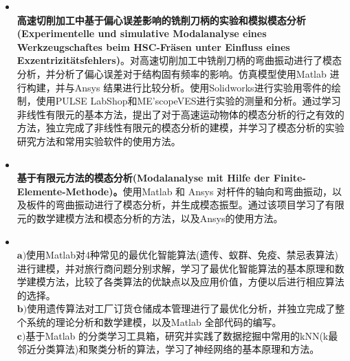 \documentclass[zh]{resume}
\begin{document}
\begin{itemize}
	\item 
	\quad {}\\
	\textbf{高速切削加工中基于偏心误差影响的铣削刀柄的实验和模拟模态分析(Experimentelle und simulative Modalanalyse eines Werkzeugs\-chaftes beim HSC-Fräsen unter Einfluss eines Exzentrizitätsfehlers)}。对高速切削加工中铣削刀柄的弯曲振动进行了模态分析，并分析了偏心误差对于结构固有频率的影响。仿真模型使用Matlab 进行构建，并与Ansys 结果进行比较分析。使用Solidworks进行实验用零件的绘制，使用PULSE LabShop和ME'scopeVES进行实验的测量和分析。通过学习非线性有限元的基本方法，提出了对于高速运动物体的模态分析的行之有效的方法，独立完成了非线性有限元的模态分析的建模，并学习了模态分析的实验研究方法和常用实验软件的使用方法。
	
	\item 
	\quad {}\\
	\textbf{基于有限元方法的模态分析(Modalanalyse mit Hilfe der Finite-Elemente-Methode)。}使用Matlab 和 Ansys 对杆件的轴向和弯曲振动，以及板件的弯曲振动进行了模态分析，并生成模态振型。通过该项目学习了有限元的数学建模方法和模态分析的方法，以及Ansys的使用方法。
	
	\item 
	\quad {}\\
	$ \mathbf{a)}  $使用Matlab对4种常见的最优化智能算法(遗传、蚁群、免疫、禁忌表算法)进行建模，并对旅行商问题分别求解，学习了最优化智能算法的基本原理和数学建模方法，比较了各类算法的优缺点以及应用价值，方便以后进行相应算法的选择。\\
	$ \mathbf{b)}  $使用遗传算法对工厂订货仓储成本管理进行了最优化分析，并独立完成了整个系统的理论分析和数学建模，以及Matlab 全部代码的编写。\\
	$ \mathbf{c)}  $基于Matlab 的分类学习工具箱，研究并实践了数据挖掘中常用的kNN(k最邻近分类算法)和聚类分析的算法，学习了神经网络的基本原理和方法。
	

\end{itemize}
\end{document}
